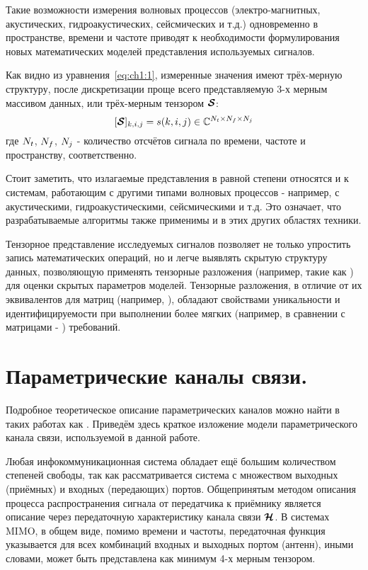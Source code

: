 Такие возможности измерения волновых процессов (электро-магнитных, акустических, гидроакустических, сейсмических и т.д.) одновременно в пространстве, времени и частоте приводят к необходимости формулирования новых математических моделей представления используемых сигналов.

Как видно из уравнения~\eqref{eq:ch1:1}, измеренные значения имеют трёх-мерную структуру, после дискретизации проще всего представляемую 3-х мерным массивом данных, или трёх-мерным тензором $\boldsymbol{\mathcal S}$:
\begin{equation}
\label{eq:ch1:2}
[\boldsymbol{\mathcal S}]_{k,i,j}=s(k,i,j)\in\mathbb{C}^{N_t\times N_f \times N_j}
\end{equation}
где $N_t$, $N_f$, $N_j$ - количество отсчётов сигнала по времени, частоте и пространству, соответственно.

Стоит заметить, что излагаемые представления в равной степени относятся и к системам, работающим с другими типами волновых процессов - например, с акустическими, гидроакустическими, сейсмическими и т.д. Это означает, что разрабатываемые алгоритмы также применимы и в этих других областях техники.

Тензорное представление исследуемых сигналов позволяет не только упростить запись математических операций, но и легче выявлять скрытую структуру данных, позволяющую применять тензорные разложения (например, такие как ) для оценки скрытых параметров моделей. Тензорные разложения, в отличие от их эквивалентов для матриц (например, ), обладают свойствами уникальности и идентифицируемости при выполнении более мягких (например, в сравнении с матрицами - ) требований.

\section{Параметрические каналы связи.}\label{sec:ch1/sec2}

Подробное теоретическое описание параметрических каналов можно найти в таких работах как \cite{Richter2005}. Приведём здесь краткое изложение модели параметрического канала связи, используемой в данной работе.

Любая инфокоммуникационная система обладает ещё большим количеством степеней свободы, так как рассматривается система с множеством выходных (приёмных) и входных (передающих) портов. Общепринятым методом описания процесса распространения сигнала от передатчика к приёмнику является описание через передаточную характеристику канала связи $\boldsymbol{\mathcal H}$. В системах MIMO, в общем виде, помимо времени и частоты, передаточная функция указывается для всех комбинаций входных и выходных портом (антенн), иными словами, может быть представлена как минимум 4-х мерным тензором.

